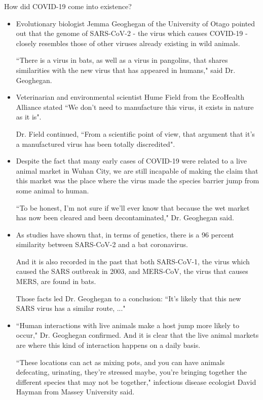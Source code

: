     \par How did COVID-19 come into existence? \parencite{CoronavirusOrigin}
      \begin{itemize}
        \item Evolutionary biologist Jemma Geoghegan of the University of Otago pointed out that the genome of SARS-CoV-2 - the virus which causes COVID-19 - closely resembles those of other viruses already existing in wild animals.
        \par ``There is a virus in bats, as well as a virus in pangolins, that shares similarities with the new virus that has appeared in humans," said Dr. Geoghegan.
        \item Veterinarian and environmental scientist Hume Field from the EcoHealth Alliance stated ``We don't need to manufacture this virus, it exists in nature as it is".
        \par Dr. Field continued, ``From a scientific point of view, that argument that it's a manufactured virus has been totally discredited".
        \item Despite the fact that many early cases of COVID-19 were related to a live animal market in Wuhan City, we are still incapable of making the claim that this market was the place where the virus made the species barrier jump from some animal to human.
        \par ``To be honest, I'm not sure if we'll ever know that because the wet market has now been cleared and been decontaminated," Dr. Geoghegan said.
        \item As studies have shown that, in terms of genetics, there is a 96 percent similarity between SARS-CoV-2 and a bat coronavirus.
        \par And it is also recorded in the past that both SARS-CoV-1, the virus which caused the SARS outbreak in 2003, and MERS‐CoV, the virus that causes MERS, are found in bats.
        \par Those facts led Dr. Geoghegan to a conclusion: ``It's likely that this new SARS virus has a similar route, ..."
        \item ``Human interactions with live animals make a host jump more likely to occur," Dr. Geoghegan confirmed. And it is clear that the live animal markets are where this kind of interaction happens on a daily basis.
        \par ``These locations can act as mixing pots, and you can have animals defecating, urinating, they're stressed maybe, you're bringing together the different species that may not be together," infectious disease ecologist David Hayman from Massey University said.

\end{itemize}
